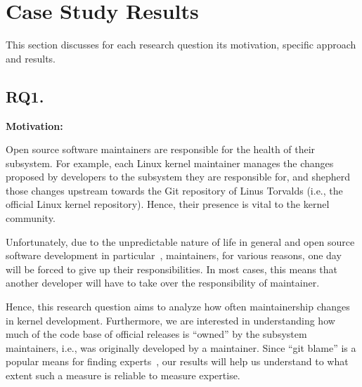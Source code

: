 
%



\section{Case Study Results}
\label{sec:case-study-results}

This section discusses for each research question its motivation, specific approach and results.

\subsection*{RQ1. \rqone}
\label{sec:rq1.-how-does}

{\bf Motivation:} 

Open source software maintainers are responsible for the health of their subsystem. For example, each Linux kernel maintainer %
manages the changes proposed by developers to the subsystem they are responsible for, and shepherd those changes upstream towards the Git repository of Linus Torvalds (i.e., the official Linux kernel repository). Hence, their presence is vital to the kernel community.

Unfortunately, due to the unpredictable nature of life in general and open source software development in particular~\cite{Wu,Zhou}, maintainers, for various reasons, one day will be forced to give up their responsibilities. In most cases, this means that another developer will have to take over the responsibility of maintainer.

Hence, this research question aims to analyze how often maintainership changes in kernel development. Furthermore, we are interested in understanding how much of the code base of official releases is ``owned'' by the subsystem maintainers, i.e., was originally developed by a maintainer. Since ``git blame'' is a popular means for finding experts~\cite{Rahman-2011}, our results will help us understand to what extent such a measure is reliable to measure expertise.%

